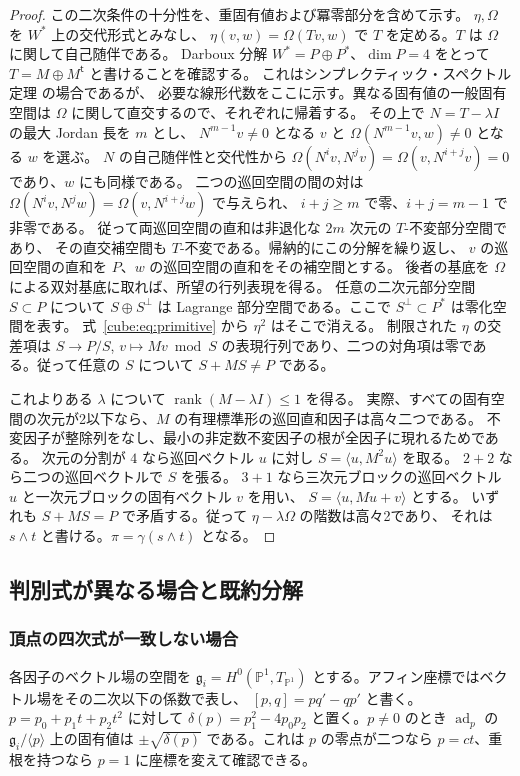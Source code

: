 \begin{proof}
この二次条件の十分性を、重固有値および冪零部分を含めて示す。
$\eta,\Omega$ を $W^*$ 上の交代形式とみなし、
$\eta(v,w)=\Omega(Tv,w)$ で $T$ を定める。$T$ は $\Omega$ に関して自己随伴である。
Darboux 分解 $W^*=P\oplus P^*$、$\dim P=4$ をとって
$T=M\oplus M^{\mathsf t}$ と書けることを確認する。
これはシンプレクティック・スペクトル定理 \cite[命題8]{cube-SM} の場合であるが、
必要な線形代数をここに示す。異なる固有値の一般固有空間は
$\Omega$ に関して直交するので、それぞれに帰着する。
その上で $N=T-\lambda I$ の最大 Jordan 長を $m$ とし、
$N^{m-1}v\ne0$ となる $v$ と
$\Omega(N^{m-1}v,w)\ne0$ となる $w$ を選ぶ。
$N$ の自己随伴性と交代性から
$\Omega(N^iv,N^jv)=\Omega(v,N^{i+j}v)=0$ であり、$w$ にも同様である。
二つの巡回空間の間の対は
$\Omega(N^iv,N^jw)=\Omega(v,N^{i+j}w)$ で与えられ、
$i+j\ge m$ で零、$i+j=m-1$ で非零である。
従って両巡回空間の直和は非退化な $2m$ 次元の $T$-不変部分空間であり、
その直交補空間も $T$-不変である。帰納的にこの分解を繰り返し、
$v$ の巡回空間の直和を $P$、$w$ の巡回空間の直和をその補空間とする。
後者の基底を $\Omega$ による双対基底に取れば、所望の行列表現を得る。
任意の二次元部分空間 $S\subset P$ について $S\oplus S^\perp$ は
Lagrange 部分空間である。ここで $S^\perp\subset P^*$ は零化空間を表す。
式~\eqref{cube:eq:primitive} から $\eta^2$ はそこで消える。
制限された $\eta$ の交差項は $S\to P/S$, $v\mapsto Mv\bmod S$
の表現行列であり、二つの対角項は零である。従って任意の $S$ について
$S+MS\ne P$ である。

これよりある $\lambda$ について $\operatorname{rank}(M-\lambda I)\le1$ を得る。
実際、すべての固有空間の次元が2以下なら、$M$ の有理標準形の巡回直和因子は高々二つである。
不変因子が整除列をなし、最小の非定数不変因子の根が全因子に現れるためである。
次元の分割が $4$ なら巡回ベクトル $u$ に対し $S=\langle u,M^2u\rangle$ を取る。
$2+2$ なら二つの巡回ベクトルで $S$ を張る。
$3+1$ なら三次元ブロックの巡回ベクトル $u$ と一次元ブロックの固有ベクトル $v$ を用い、
$S=\langle u,Mu+v\rangle$ とする。
いずれも $S+MS=P$ で矛盾する。従って $\eta-\lambda\Omega$ の階数は高々2であり、
それは $s\wedge t$ と書ける。$\pi=\gamma(s\wedge t)$ となる。
\end{proof}
\subsection{判別式が異なる場合と既約分解}
\subsubsection{頂点の四次式が一致しない場合}
各因子のベクトル場の空間を $\mathfrak g_i=H^0(\mathbb P^1,T_{\mathbb P^1})$
とする。アフィン座標ではベクトル場をその二次以下の係数で表し、
$[p,q]=pq'-qp'$ と書く。$p=p_0+p_1t+p_2t^2$ に対して
$\delta(p)=p_1^2-4p_0p_2$ と置く。$p\ne0$ のとき
$\operatorname{ad}_p$ の $\mathfrak g_i/\langle p\rangle$ 上の固有値は
$\pm\sqrt{\delta(p)}$ である。これは $p$ の零点が二つなら
$p=ct$、重根を持つなら $p=1$ に座標を変えて確認できる。

